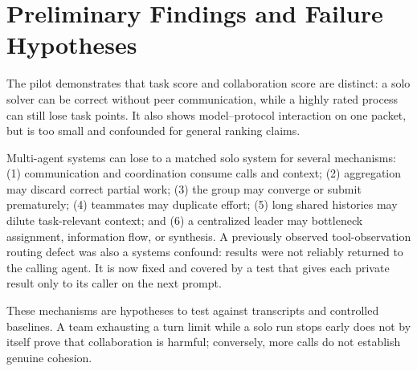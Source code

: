 \section{Preliminary Findings and Failure Hypotheses}
The pilot demonstrates that task score and collaboration score are distinct:
a solo solver can be correct without peer communication, while a highly rated
process can still lose task points. It also shows model--protocol interaction
on one packet, but is too small and confounded for general ranking claims.

Multi-agent systems can lose to a matched solo system for several mechanisms:
(1) communication and coordination consume calls and context; (2) aggregation
may discard correct partial work; (3) the group may converge or submit
prematurely; (4) teammates may duplicate effort; (5) long shared histories may
dilute task-relevant context; and (6) a centralized leader may bottleneck
assignment, information flow, or synthesis. A previously observed
tool-observation routing defect was also a systems confound: results were not
reliably returned to the calling agent. It is now fixed and covered by a test
that gives each private result only to its caller on the next prompt.

These mechanisms are hypotheses to test against transcripts and controlled
baselines. A team exhausting a turn limit while a solo run stops early does
not by itself prove that collaboration is harmful; conversely, more calls do
not establish genuine cohesion.
